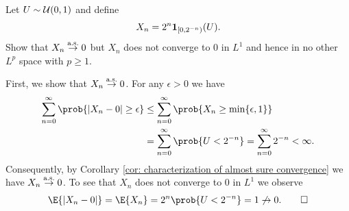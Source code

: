 \begin{exercise}
    \label{ex: as but not Lp}
    Let \(U\sim \mathcal{U}(0,1)\) and define
    \[
        X_n = 2^n \ind{[0, 2^{-n})}(U).
    \]
    Show that \(X_n \overset{\operatorname{\text{a.s.}}}\to 0\) but \(X_n\) does not converge to \(0\)
    in \(L^1\) and hence in no other \(L^p\) space with \(p \ge 1\).
    \begin{solution}
        First, we show that \(X_n \overset{\operatorname{\text{a.s.}}}\to 0\). For any \(\epsilon > 0\)
        we have
        \[\begin{aligned}
            \sum_{n=0}^\infty \prob{\abs{X_n - 0} \ge \epsilon}
            &\le \sum_{n=0}^\infty \prob{X_n \ge \min\set{\epsilon, 1}}
            \\
            &= \sum_{n=0}^\infty\prob{U < 2^{-n}} = \sum_{n=0}^\infty 2^{-n} < \infty.
        \end{aligned}
        \]
        Consequently, by Corollary \ref{cor: characterization of almost sure convergence} we have \(X_n \overset{\operatorname{\text{a.s.}}}\to 0\).
        To see that \(X_n\) does not converge to \(0\) in \(L^1\) we observe
        \[
            \E{\abs{X_n - 0}}
            = \E{X_n}
            = 2^n \prob{U < 2^{-n}} = 1
            \not\to 0.
            \qedhere
        \]
    \end{solution}
\end{exercise}

